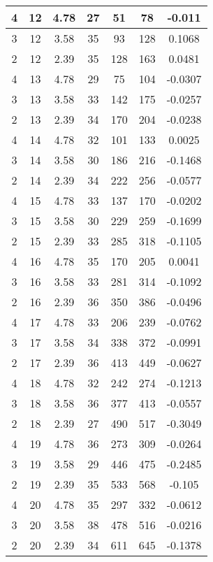 \documentclass[letterpaper, 12pt]{article}
\begin{document}
\begin{longtable}{|c|c|c|c|c|c|c|}
\hline
4 & 12 & 4.78 & 27 & 51 & 78 & -0.011 \\
\hline
3 & 12 & 3.58 & 35 & 93 & 128 & 0.1068 \\
\hline
2 & 12 & 2.39 & 35 & 128 & 163 & 0.0481 \\
\hline
4 & 13 & 4.78 & 29 & 75 & 104 & -0.0307 \\
\hline
3 & 13 & 3.58 & 33 & 142 & 175 & -0.0257 \\
\hline
2 & 13 & 2.39 & 34 & 170 & 204 & -0.0238 \\
\hline
4 & 14 & 4.78 & 32 & 101 & 133 & 0.0025 \\
\hline
3 & 14 & 3.58 & 30 & 186 & 216 & -0.1468 \\
\hline
2 & 14 & 2.39 & 34 & 222 & 256 & -0.0577 \\
\hline
4 & 15 & 4.78 & 33 & 137 & 170 & -0.0202 \\
\hline
3 & 15 & 3.58 & 30 & 229 & 259 & -0.1699 \\
\hline
2 & 15 & 2.39 & 33 & 285 & 318 & -0.1105 \\
\hline
4 & 16 & 4.78 & 35 & 170 & 205 & 0.0041 \\
\hline
3 & 16 & 3.58 & 33 & 281 & 314 & -0.1092 \\
\hline
2 & 16 & 2.39 & 36 & 350 & 386 & -0.0496 \\
\hline
4 & 17 & 4.78 & 33 & 206 & 239 & -0.0762 \\
\hline
3 & 17 & 3.58 & 34 & 338 & 372 & -0.0991 \\
\hline
2 & 17 & 2.39 & 36 & 413 & 449 & -0.0627 \\
\hline
4 & 18 & 4.78 & 32 & 242 & 274 & -0.1213 \\
\hline
3 & 18 & 3.58 & 36 & 377 & 413 & -0.0557 \\
\hline
2 & 18 & 2.39 & 27 & 490 & 517 & -0.3049 \\
\hline
4 & 19 & 4.78 & 36 & 273 & 309 & -0.0264 \\
\hline
3 & 19 & 3.58 & 29 & 446 & 475 & -0.2485 \\
\hline
2 & 19 & 2.39 & 35 & 533 & 568 & -0.105 \\
\hline
4 & 20 & 4.78 & 35 & 297 & 332 & -0.0612 \\
\hline
3 & 20 & 3.58 & 38 & 478 & 516 & -0.0216 \\
\hline
2 & 20 & 2.39 & 34 & 611 & 645 & -0.1378 \\
\hline
\end{longtable}
\end{document}
